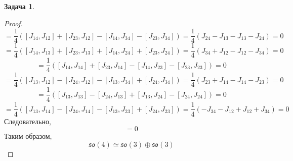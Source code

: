 \documentclass[12pt]{article}
\theoremstyle{definition}
\newtheorem{zad}{Задача}[section]
\begin{document}
\begin{zad}
\begin{itemize}
\begin{proof}
\begin{equation*}
        \end{equation*}
        \begin{equation*}
            [J_2,J'_1]=\frac{1}{4}([J_{14},J_{12}]+[J_{23},J_{12}]-[J_{14},J_{34}]-[J_{23},J_{34}])=\frac{1}{4}(J_{24}-J_{13}-J_{13}-J_{24})=0
        \end{equation*}
        \begin{equation*}
            [J_2,J'_2]=\frac{1}{4}([J_{14},J_{13}]+[J_{23},J_{13}]+[J_{14},J_{24}]+[J_{23},J_{24}])=\frac{1}{4}(J_{34}+J_{12}-J_{12}-J_{34})=0
        \end{equation*}
        \begin{equation*}
            [J_2,J'_3]=\frac{1}{4}([J_{14},J_{14}]+[J_{23},J_{14}]-[J_{14},J_{23}]-[J_{23},J_{23}])=0
        \end{equation*}
        \begin{equation*}
            [J_3,J'_1]=\frac{1}{4}([J_{13},J_{12}]-[J_{24},J_{12}]-[J_{13},J_{34}]+[J_{24},J_{34}])=\frac{1}{4}(J_{23}+J_{14}-J_{14}-J_{23})=0
        \end{equation*}
        \begin{equation*}
            [J_3,J'_2]=\frac{1}{4}([J_{13},J_{13}]-[J_{24},J_{13}]+[J_{13},J_{24}]-[J_{24},J_{24}])=0
        \end{equation*}
        \begin{equation*}
            [J_3,J'_3]=\frac{1}{4}([J_{13},J_{14}]-[J_{24},J_{14}]-[J_{13},J_{23}]+[J_{24},J_{23}])=\frac{1}{4}(-J_{34}-J_{12}+J_{12}+J_{34})=0
        \end{equation*}
        Следовательно,
        \begin{equation}
            [J_i,J'_j]=0
        \end{equation}
        Таким образом,
        \begin{equation}
            \boxed{\mathfrak{so}(4)\simeq\mathfrak{so}(3)\oplus\mathfrak{so}(3)}
        \end{equation}
    \end{proof}
\end{itemize}
\end{zad}
\end{document}
